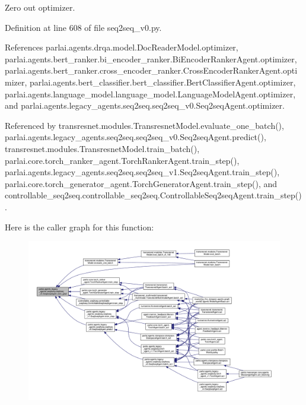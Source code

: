 \begin{DoxyVerb}Zero out optimizer.\end{DoxyVerb}
 

Definition at line 608 of file seq2seq\+\_\+v0.\+py.



References parlai.\+agents.\+drqa.\+model.\+Doc\+Reader\+Model.\+optimizer, parlai.\+agents.\+bert\+\_\+ranker.\+bi\+\_\+encoder\+\_\+ranker.\+Bi\+Encoder\+Ranker\+Agent.\+optimizer, parlai.\+agents.\+bert\+\_\+ranker.\+cross\+\_\+encoder\+\_\+ranker.\+Cross\+Encoder\+Ranker\+Agent.\+optimizer, parlai.\+agents.\+bert\+\_\+classifier.\+bert\+\_\+classifier.\+Bert\+Classifier\+Agent.\+optimizer, parlai.\+agents.\+language\+\_\+model.\+language\+\_\+model.\+Language\+Model\+Agent.\+optimizer, and parlai.\+agents.\+legacy\+\_\+agents.\+seq2seq.\+seq2seq\+\_\+v0.\+Seq2seq\+Agent.\+optimizer.



Referenced by transresnet.\+modules.\+Transresnet\+Model.\+evaluate\+\_\+one\+\_\+batch(), parlai.\+agents.\+legacy\+\_\+agents.\+seq2seq.\+seq2seq\+\_\+v0.\+Seq2seq\+Agent.\+predict(), transresnet.\+modules.\+Transresnet\+Model.\+train\+\_\+batch(), parlai.\+core.\+torch\+\_\+ranker\+\_\+agent.\+Torch\+Ranker\+Agent.\+train\+\_\+step(), parlai.\+agents.\+legacy\+\_\+agents.\+seq2seq.\+seq2seq\+\_\+v1.\+Seq2seq\+Agent.\+train\+\_\+step(), parlai.\+core.\+torch\+\_\+generator\+\_\+agent.\+Torch\+Generator\+Agent.\+train\+\_\+step(), and controllable\+\_\+seq2seq.\+controllable\+\_\+seq2seq.\+Controllable\+Seq2seq\+Agent.\+train\+\_\+step().

Here is the caller graph for this function\+:
\nopagebreak
\begin{figure}[H]
\begin{center}
\leavevmode
\includegraphics[width=350pt]{classparlai_1_1agents_1_1legacy__agents_1_1seq2seq_1_1seq2seq__v0_1_1Seq2seqAgent_a0be9f1e378a403284d8afac5648fbf4d_icgraph}
\end{center}
\end{figure}


